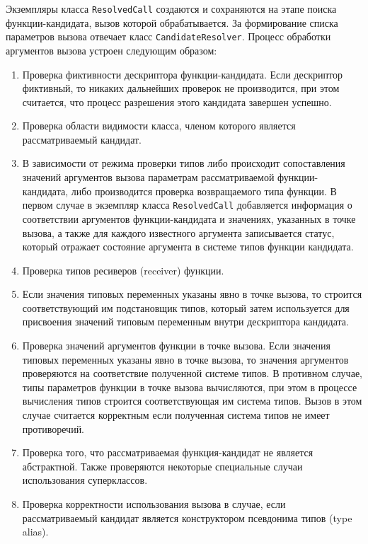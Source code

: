 Экземпляры класса \lstinline{ResolvedCall} создаются и сохраняются на этапе поиска функции-кандидата, вызов которой обрабатывается. За формирование списка параметров вызова отвечает класс \lstinline{CandidateResolver}. Процесс обработки аргументов вызова устроен следующим образом:
\begin{enumerate}
    \item Проверка фиктивности дескриптора функции-кандидата. Если дескриптор фиктивный, то никаких дальнейших проверок не производится, при этом считается, что процесс разрешения этого кандидата завершен успешно.  
    \item Проверка области видимости класса, членом которого является рассматриваемый кандидат. 
    \item В зависимости от режима проверки типов либо происходит сопоставления значений аргументов вызова параметрам рассматриваемой функции-кандидата, либо производится проверка возвращаемого типа функции. В первом случае в экземпляр класса \lstinline{ResolvedCall} добавляется информация о соответствии аргументов функции-кандидата и значениях, указанных в точке вызова, а также для каждого известного аргумента записывается статус, который отражает состояние аргумента в системе типов функции кандидата.  
    \item Проверка типов ресиверов (receiver) функции.
    \item Если значения типовых переменных указаны явно в точке вызова, то строится соответствующий им подстановщик типов, который затем используется для присвоения значений типовым переменным внутри дескриптора кандидата.
    \item Проверка значений аргументов функции в точке вызова. Если значения типовых переменных указаны явно в точке вызова, то значения аргументов проверяются на соответствие полученной системе типов. В противном случае, типы параметров функции в точке вызова вычисляются, при этом в процессе вычисления типов строится соответствующая им система типов. Вызов в этом случае считается корректным если полученная система типов не имеет противоречий.      
    \item Проверка того, что рассматриваемая функция-кандидат не является абстрактной. Также проверяются некоторые специальные случаи использования суперклассов. 
    \item Проверка корректности использования вызова в случае, если рассматриваемый кандидат является конструктором псевдонима типов (type alias). 
\end{enumerate}

